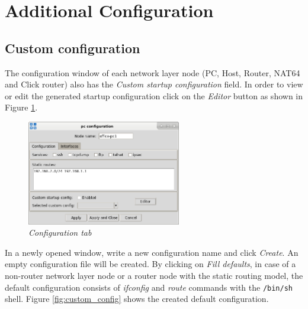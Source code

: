 \section{Additional Configuration}

\subsection{Custom configuration}



The configuration window of each network layer node (PC, Host, Router, NAT64
and Click router) also has the \emph{Custom startup configuration} field. In
order to view or edit the generated startup configuration click on the
\emph{Editor} button as shown in Figure \ref{fig:config_tab}.

\begin{figure}[H]
\centering
\vspace{10pt}
\includegraphics[width=0.6\textwidth]{./images/configuration_tab.png}
\caption{\emph{Configuration tab}}
\label{fig:config_tab}
\end{figure} 

In a newly opened window, write a new configuration name and click
\emph{Create}. An empty configuration file will be created. By clicking on
\emph{Fill defaults}, in case of a non-router network layer node or a router
node with the static routing model, the default configuration consists of
\emph{ifconfig} and \emph{route} commands with the \texttt{/bin/sh} shell.
Figure \ref{fig:custom_config} shows the created default configuration.

